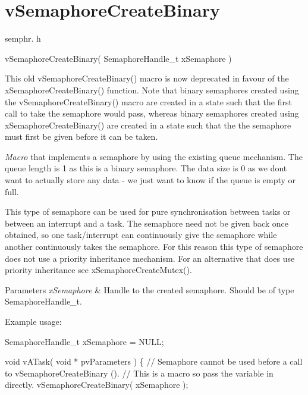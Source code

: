 \hypertarget{group__v_semaphore_create_binary}{}\section{v\+Semaphore\+Create\+Binary}
\label{group__v_semaphore_create_binary}
semphr. h 
\begin{DoxyPre}vSemaphoreCreateBinary( SemaphoreHandle\_t xSemaphore )\end{DoxyPre}


This old v\+Semaphore\+Create\+Binary() macro is now deprecated in favour of the x\+Semaphore\+Create\+Binary() function. Note that binary semaphores created using the v\+Semaphore\+Create\+Binary() macro are created in a state such that the first call to \textquotesingle{}take\textquotesingle{} the semaphore would pass, whereas binary semaphores created using x\+Semaphore\+Create\+Binary() are created in a state such that the the semaphore must first be \textquotesingle{}given\textquotesingle{} before it can be \textquotesingle{}taken\textquotesingle{}.

{\itshape Macro} that implements a semaphore by using the existing queue mechanism. The queue length is 1 as this is a binary semaphore. The data size is 0 as we don\textquotesingle{}t want to actually store any data -\/ we just want to know if the queue is empty or full.

This type of semaphore can be used for pure synchronisation between tasks or between an interrupt and a task. The semaphore need not be given back once obtained, so one task/interrupt can continuously \textquotesingle{}give\textquotesingle{} the semaphore while another continuously \textquotesingle{}takes\textquotesingle{} the semaphore. For this reason this type of semaphore does not use a priority inheritance mechanism. For an alternative that does use priority inheritance see x\+Semaphore\+Create\+Mutex().


\begin{DoxyParams}{Parameters}
{\em x\+Semaphore} & Handle to the created semaphore. Should be of type Semaphore\+Handle\+\_\+t.\\
\hline
\end{DoxyParams}
Example usage\+: 
\begin{DoxyPre}
SemaphoreHandle\_t xSemaphore = NULL;\end{DoxyPre}



\begin{DoxyPre}void vATask( void * pvParameters )
\{
   // Semaphore cannot be used before a call to vSemaphoreCreateBinary ().
   // This is a macro so pass the variable in directly.
   vSemaphoreCreateBinary( xSemaphore );\end{DoxyPre}



